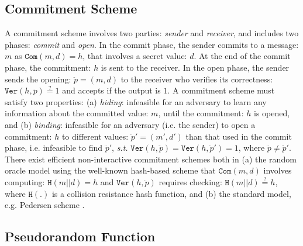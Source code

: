 \vspace{-4mm}

\subsection{Commitment Scheme} 
\vspace{-1.4mm}

A commitment scheme involves two parties:  \emph{sender} and  \emph{receiver}, and includes  two phases: \emph{commit} and  \emph{open}. In the commit phase, the sender  commits to a message: $m$ as $\mathtt{Com}(m,d)=h$, that involves a secret value: $d$. At the end of the commit phase,  the commitment: $h$ is sent to the receiver. In the open phase, the sender sends the opening: $\ddot{p}=(m,d)$ to the receiver who verifies its correctness: $\mathtt{Ver}(h,\ddot{p})\stackrel{\scriptscriptstyle ?}=1$ and accepts if the output is $1$.  A commitment scheme must satisfy two properties: (a) \textit{hiding}: infeasible for an adversary  to learn any information about the committed  value: $m$, until the commitment: $h$ is opened, and (b) \textit{binding}:   infeasible for an adversary (i.e. the sender) to open a commitment: $h$ to different values: $\ddot{p}'=(m',d')$ than that used in the commit phase, i.e. infeasible to find  $\ddot{p}'$, \textit{s.t.} $\mathtt{Ver}(h,\ddot{p})=\mathtt{Ver}(h,\ddot{p}')=1$, where $\ddot{p}\neq \ddot{p}'$.  There exist efficient non-interactive  commitment schemes both in (a) the random oracle model using the well-known hash-based scheme  that $\mathtt{Com}(m,d)$ involves computing: $\mathtt{H}(m||d)=h$ and $\mathtt{Ver}(h,\ddot{p})$ requires checking: $\mathtt{H}(m||d)\stackrel{\scriptscriptstyle ?}=h$, where $\mathtt{H}(.)$ is a collision resistance hash function, and (b)  the standard model, e.g. Pedersen scheme \cite{Pedersen91}. 


\vspace{-5mm}


\subsection{Pseudorandom Function}

\vspace{-2mm}

